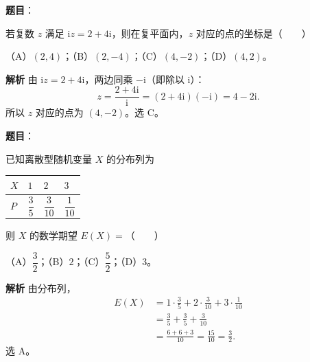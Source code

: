 \begin{answer}

\textbf{题目}：

若复数 $z$ 满足 $\mathrm iz=2+4\mathrm i$，则在复平面内，$z$ 对应的点的坐标是\mbox{（　　）}

（A）$(2,4)$；（B）$(2,-4)$；（C）$(4,-2)$；（D）$(4,2)$。

\textbf{解析}
由 $\mathrm iz=2+4\mathrm i$，两边同乘 $-\mathrm i$（即除以 $\mathrm i$）：
\nopagebreak[4]
\[z=\frac{2+4\mathrm i}{\mathrm i}=(2+4\mathrm i)(-\mathrm i)=4-2\mathrm i.\]
所以 $z$ 对应的点为 $(4,-2)$。选 C。


\end{answer}
\begin{answer}

\textbf{题目}：

已知离散型随机变量 $X$ 的分布列为

\begin{center}
\begin{tabular}{llll}
\toprule
$X$ & $1$ & $2$ & $3$ \\
\midrule
$P$ & $\dfrac35$ & $\dfrac3{10}$ & $\dfrac1{10}$ \\
\bottomrule
\end{tabular}
\end{center}

则 $X$ 的数学期望 $E(X)=$\mbox{（　　）}

（A）$\dfrac32$；（B）$2$；（C）$\dfrac52$；（D）$3$。

\textbf{解析}
由分布列，
\nopagebreak[4]
\[\begin{aligned}
E(X)&=1\cdot\frac35+2\cdot\frac3{10}+3\cdot\frac1{10}\\
&=\frac35+\frac35+\frac3{10}\\
&=\frac{6+6+3}{10}=\frac{15}{10}=\frac32.
\end{aligned}\]
选 A。


\end{answer}
